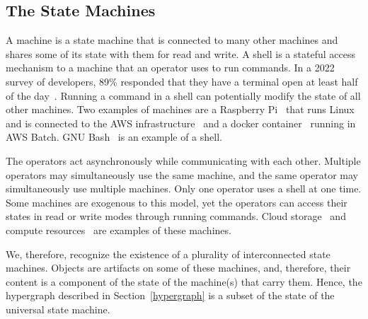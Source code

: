 \subsection{The State Machines}\label{state_machine}

A machine is a state machine that is connected to many other machines and shares some of its state with them for read and write. A shell is a stateful access mechanism to a machine that an operator uses to run commands. In a 2022 survey of developers, 89\% responded that they have a terminal open at least half of the day~\cite{textualize_founded}. Running a command in a shell can potentially modify the state of all other machines. Two examples of machines are a Raspberry Pi~\cite{rpi} that runs Linux and is connected to the AWS infrastructure~\cite{aws} and a docker container~\cite{docker} running in AWS Batch. GNU Bash~\cite{gnu_bash} is an example of a shell.

The operators act asynchronously while communicating with each other. Multiple operators may simultaneously use the same machine, and the same operator may simultaneously use multiple machines. Only one operator uses a shell at one time. Some machines are exogenous to this model, yet the operators can access their states in read or write modes through running commands. Cloud storage~\cite{aws_s3} and compute resources~\cite{aws_batch} are examples of these machines.

We, therefore, recognize the existence of a plurality of interconnected state machines. Objects are artifacts on some of these machines, and, therefore, their content is a component of the state of the machine(s) that carry them. Hence, the hypergraph described in Section~\ref{hypergraph} is a subset of the state of the universal state machine.
